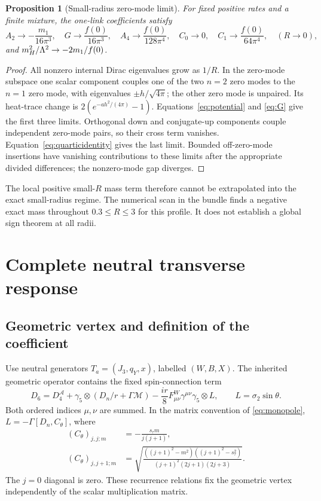 \documentclass[11pt,letterpaper]{article}
\newcommand{\M}{\mathcal M}\newcommand{\B}{\mathcal B}
\newtheorem{proposition}{Proposition}
\begin{document}
\begin{proposition}[Small-radius zero-mode limit]
For fixed positive rates and a finite mixture, the one-link coefficients satisfy
\begin{equation}
 A_2\longrightarrow-\frac{m_1}{16\pi^3},\quad
 G\longrightarrow\frac{f(0)}{16\pi^3},\quad
 A_4\longrightarrow\frac{f(0)}{128\pi^4},\quad
 C_0\longrightarrow0,\quad C_1\longrightarrow\frac{f(0)}{64\pi^4},
 \quad(R\to0),\label{eq:smallR}
\end{equation}
and $m_H^2/\Lambda^2\to-2m_1/f(0)$.
\end{proposition}
\begin{proof}
All nonzero internal Dirac eigenvalues grow as $1/R$. In the zero-mode subspace one scalar component couples one of the two $n=2$ zero modes to the $n=1$ zero mode, with eigenvalues $\pm h/\sqrt{4\pi}$; the other zero mode is unpaired. Its heat-trace change is $2(e^{-ah^2/(4\pi)}-1)$. Equations~\eqref{eq:potential} and \eqref{eq:G} give the first three limits. Orthogonal down and conjugate-up components couple independent zero-mode pairs, so their cross term vanishes. Equation~\eqref{eq:quarticidentity} gives the last limit. Bounded off-zero-mode insertions have vanishing contributions to these limits after the appropriate divided differences; the nonzero-mode gap diverges.
\end{proof}
The local positive small-$R$ mass term therefore cannot be extrapolated into the exact small-radius regime. The numerical scan in the bundle finds a negative exact mass throughout $0.3\le R\le3$ for this profile. It does not establish a global sign theorem at all radii.

\section{Complete neutral transverse response}

\subsection{Geometric vertex and definition of the coefficient}

Use neutral generators $T_a=(J_3,q_Y,x)$, labelled $(W,B,X)$. The inherited geometric operator contains the fixed spin-connection term \cite{weak,Baptista,Kaad}
\begin{equation}
 D_6=D_4^{\mathcal A}+\gamma_5\otimes(D_n/r+\Gamma\M)
       -\frac{ir}{8}F^W_{\mu\nu}\gamma^{\mu\nu}\gamma_5\otimes L,
 \qquad L=\sigma_2\sin\theta.
 \label{eq:fullD}
\end{equation}
Both ordered indices $\mu,\nu$ are summed. In the matrix convention of \eqref{eq:monopole}, $L=-\Gamma[D_n,C_\theta]$, where
\begin{align}
 (C_\theta)_{j,j;m}&=-\frac{s_\tau m}{j(j+1)},\\
 (C_\theta)_{j,j+1;m}&=
 \sqrt{\frac{((j+1)^2-m^2)((j+1)^2-s_\tau^2)}{(j+1)^2(2j+1)(2j+3)}}.
 \label{eq:C}
\end{align}
The $j=0$ diagonal is zero. These recurrence relations fix the geometric vertex independently of the scalar multiplication matrix.
\end{document}
